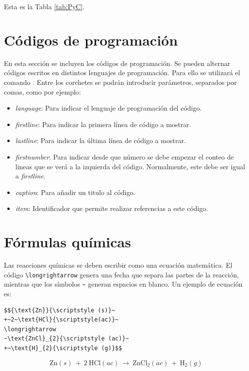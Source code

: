 \documentclass[10pt,a4paper]{article}
\begin{document}
Esta es la Tabla \ref{tab:PyC}.


\section{Códigos de programación}%

En esta sección se incluyen los códigos de programación. Se pueden alternar códigos escritos en distintos lenguajes de programación. Para ello se utilizará el comando \verb||.
Entre los corchetes se podrán introducir parámetros, separados por comas, como por ejemplo:
\begin{itemize}
    \item \textit{language}: Para indicar el lenguaje de programación del código.
    \item \textit{firstline}: Para indicar la primera línea de código a mostrar.
    \item \textit{lastline}: Para indicar la última línea de código a mostrar.
    \item \textit{firstnumber}: Para indicar desde que número se debe empezar el conteo de lineas que se verá a la izquierda del código. Normalmente, este debe ser igual a \textit{firstline}.
    \item \textit{caption}: Para añadir un titulo al código.
    \item \textit{item}: Identificador que permite realizar referencias a este código.
\end{itemize}


\bigskip


\section{Fórmulas químicas}%

Las reacciones químicas se deben escribir como una ecuación matemática. El código \verb/\longrightarrow/ genera una fecha que separa las partes de la reacción, mientras que los símbolos \verb/~/ generan espacios en blanco. Un ejemplo de ecuación es:

\bigskip

\begin{minipage}{0.45\textwidth}
\begin{verbatim}
$${\text{Zn}}{\scriptstyle (s)}~
+~2~\text{HCl}{\scriptstyle(ac)}~
\longrightarrow 
~\text{ZnCl}_{2}{\scriptstyle (ac)}~ 
+~\text{H}_{2}{\scriptstyle (g)}$$
\end{verbatim}
\end{minipage}
\noindent\begin{minipage}{0.55\textwidth}
$${\text{Zn}}{\scriptstyle (s)}~
+~2~\text{HCl}{\scriptstyle(ac)}~
\longrightarrow 
~\text{ZnCl}_{2}{\scriptstyle (ac)}~ 
+~\text{H}_{2}{\scriptstyle (g)}$$
\end{minipage}
\end{document}
